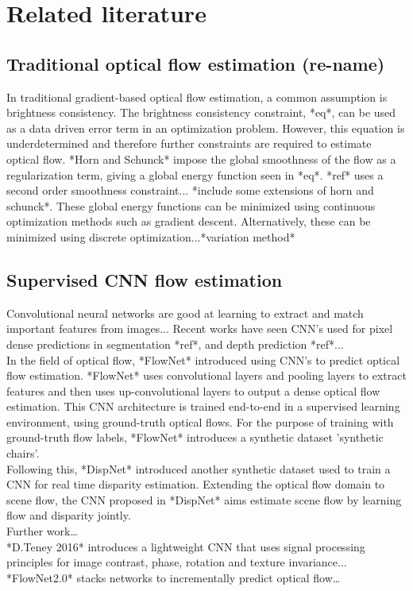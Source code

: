 
\section{Related literature}

\subsection{Traditional optical flow estimation (re-name)}
In traditional gradient-based optical flow estimation, a common assumption is brightness consistency. The brightness consistency constraint, *eq*, can be used as a data driven error term in an optimization problem. However, this equation is underdetermined and therefore further constraints are required to estimate optical flow. *Horn and Schunck* impose the global smoothness of the flow as a regularization term, giving a global energy function seen in *eq*. *ref* uses a second order smoothness constraint... *include some extensions of horn and schunck*. These global energy functions can be minimized using continuous optimization methods such as gradient descent. Alternatively, these can be minimized using discrete optimization...*variation method* \\

\subsection{Supervised CNN flow estimation}
Convolutional neural networks are good at learning to extract and match important features from images...
Recent works have seen CNN’s used for pixel dense predictions in segmentation *ref*, and depth prediction *ref*... \\
In the field of optical flow, *FlowNet* introduced using CNN’s to predict optical flow estimation. *FlowNet* uses convolutional layers and pooling layers to extract features and then uses up-convolutional layers to output a dense optical flow estimation. This CNN architecture is trained end-to-end in a supervised learning environment, using ground-truth optical flows. For the purpose of training with ground-truth flow labels, *FlowNet* introduces a synthetic dataset 'synthetic chairs'.\\
Following this, *DispNet* introduced another synthetic dataset used to train a CNN for real time disparity estimation. Extending the optical flow domain to scene flow, the CNN proposed in *DispNet* aims estimate scene flow by learning flow and disparity jointly.\\
Further work… \\
*D.Teney 2016* introduces a lightweight CNN that uses signal processing principles for image contrast, phase, rotation and texture invariance... \\
*FlowNet2.0* stacks networks to incrementally predict optical flow…\\


